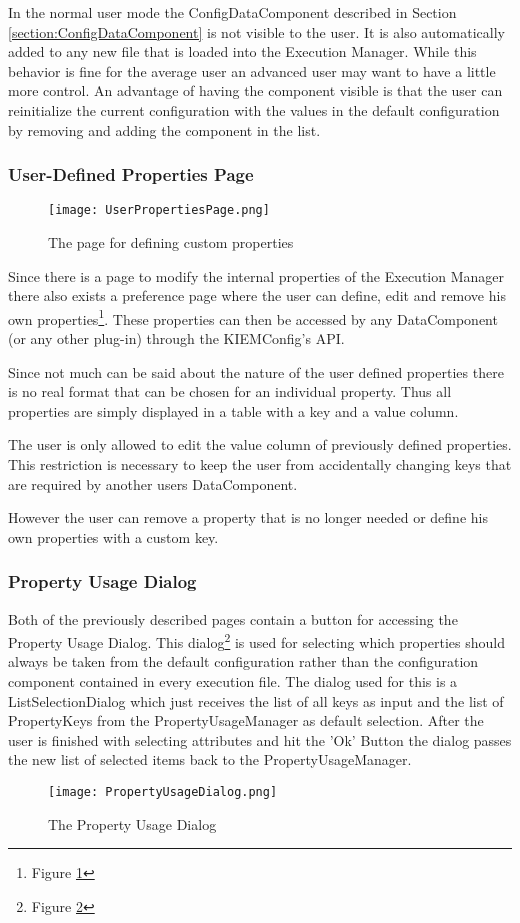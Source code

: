 In the normal user mode the ConfigDataComponent described in Section \ref{section:ConfigDataComponent} is
not visible to the user. It is also automatically added to any new file that is loaded into the Execution Manager.
While this behavior is fine for the average user an advanced user may want to have a little more control. An advantage
of having the component visible is that the user can reinitialize the current configuration with the values in
the default configuration by removing and adding the component in the list.


\subsubsection{User-Defined Properties Page}
\label{section:UserDefinedPropertiesPage}
\begin{figure}
  \centering
  \texttt{[image: UserPropertiesPage.png]}
  \caption[The page for defining custom properties]%
  {The page for defining custom properties\protect}
  \label{fig:UserDefinedPropertiesPage}
\end{figure}
Since there is a page to modify the internal properties of the Execution Manager there also exists a
preference page where the user can define, edit and remove his own properties\footnote{Figure \ref{fig:UserDefinedPropertiesPage}}. 
These properties can then be accessed by any DataComponent (or any other plug-in) through the \ac{KIEMConfig}'s \ac{API}.

Since not much can be said about the nature of the user defined properties there is no real format that
can be chosen for an individual property. Thus all properties are simply displayed in a table with a 
key and a value column. 

The user is only allowed to edit the value column of previously defined properties. This restriction is
necessary to keep the user from accidentally changing keys that are required by another users DataComponent.

However the user can remove a property that is no longer needed or define his own properties with a custom key.

\subsubsection{Property Usage Dialog}
Both of the previously described pages contain a button for accessing the Property Usage Dialog.
This dialog\footnote{Figure \ref{fig:PropertyUsageDialog}} is used for selecting which properties should always be taken
from the default configuration rather than the configuration component contained in every execution file.
The dialog used for this is a ListSelectionDialog which just receives the list of
all keys as input and the list of PropertyKeys from the PropertyUsageManager as default selection.
After the user is finished with selecting attributes and hit the 'Ok' Button the dialog
passes the new list of selected items back to the PropertyUsageManager.
\begin{figure}
  \centering
  \texttt{[image: PropertyUsageDialog.png]}
  \caption[Property Usage Dialog]%
  {The Property Usage Dialog\protect}
  \label{fig:PropertyUsageDialog}
\end{figure}

